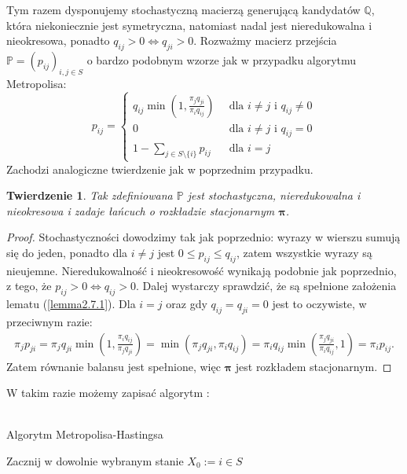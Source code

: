 \documentclass[a4paper]{article}
\theoremstyle{defn}
\theoremstyle{theorem}
\newtheorem{theorem}[defn]{Twierdzenie}
\theoremstyle{lemma}
\theoremstyle{cor}
\theoremstyle{fact}
\begin{document}
Tym razem dysponujemy stochastyczną macierzą generującą kandydatów $\mathbb{Q}$, która niekoniecznie jest symetryczna, natomiast nadal jest nieredukowalna i nieokresowa, ponadto $q_{ij} > 0 	\Leftrightarrow q_{ji} > 0$. Rozważmy macierz przejścia $\mathbb{P} = (p_{ij})_{i,j \in S}$ o bardzo podobnym wzorze jak w przypadku algorytmu Metropolisa:
$$
    p_{ij} = \begin{cases} q_{ij} \min(1, \frac{\pi_j q_{ji}}{\pi_i q_{ij}}) \,\,\,&\text{dla $i \neq j$ i $q_{ij} \neq 0$}\\
                    0 \,\,\, &\text{dla $i \neq j$ i $q_{ij} = 0$}\\
                    1 - \sum\limits_{j \in S \setminus \{i\}} p_{ij}\,\,\, &\text{dla $i = j$}
            \end{cases}
$$
Zachodzi analogiczne twierdzenie jak w poprzednim przypadku.
\begin{theorem}\label{theorem3.3.2}
Tak zdefiniowana $\mathbb{P}$ jest stochastyczna, nieredukowalna i nieokresowa i zadaje łańcuch o rozkładzie stacjonarnym $\boldsymbol{\pi}$.
\end{theorem}
\begin{proof}
Stochastyczności dowodzimy tak jak poprzednio: wyrazy w wierszu sumują się do jeden, ponadto dla $i \neq j$ jest $0 \leq p_{ij} \leq q_{ij}$, zatem wszystkie wyrazy są nieujemne. Nieredukowalność i nieokresowość wynikają podobnie jak poprzednio, z tego, że $p_{ij} > 0 	\Leftrightarrow q_{ij} > 0$. Dalej wystarczy sprawdzić, że są spełnione założenia lematu (\ref{lemma2.7.1}). Dla $i=j$ oraz gdy $q_{ij} = q_{ji} =  0$ jest to oczywiste, w przeciwnym razie:
\begin{align*}
    \pi_j p_{ji} = \pi_j q_{ji} \min(1, \frac{\pi_i q_{ij}}{\pi_j q_{ji}}) =  \min(\pi_j q_{ji}, \pi_i q_{ij}) = \pi_i q_{ij} \min(\frac{\pi_j q_{ji}}{\pi_i q_{ij}}, 1) = \pi_i p_{ij}.
\end{align*}
Zatem równanie balansu jest spełnione, więc $\boldsymbol{\pi}$ jest rozkładem stacjonarnym.
\end{proof}
W takim razie możemy zapisać algorytm \cite{hastings}:\\\\
\begin{algorithm}[H]
\caption{Algorytm Metropolisa-Hastingsa}
Zacznij w dowolnie wybranym stanie $X_0 := i \in S$\;
\end{algorithm}
\end{document}
